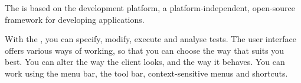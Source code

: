 

The \ite{} is based on the  development platform,  a
 platform-independent, open-source framework for developing applications. 

With the \ite{}, you can specify, modify, execute and analyse tests. 
The user interface offers various ways of working, so that you can choose the way that suits you best. You can alter the way the client looks, and the way it behaves. You can work using the menu bar, the tool bar, context-sensitive menus and shortcuts.  
 
 
